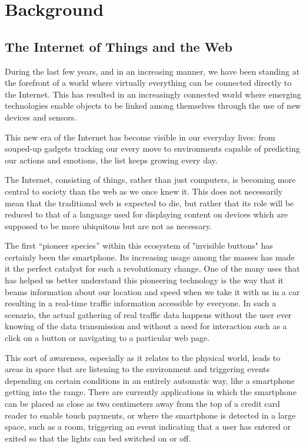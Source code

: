 \chead{}
\chapter{Background}

\section{The Internet of Things and the Web}
  
During the last few years, and in an increasing manner, we have been standing at the forefront of a world where virtually everything can be connected directly to the Internet. This has resulted in an increasingly connected world where emerging technologies enable objects to be linked among themselves through the use of new devices and sensors.

This new era of the Internet has become visible in our everyday lives: from souped-up gadgets tracking our every move to environments capable of predicting our actions and emotions, the list keeps growing every day.

The Internet, consisting of things, rather than just computers, is becoming more central to society than the web as we once knew it. This does not necessarily mean that the traditional web is expected to die, but rather that its role will be reduced to that of a language used for displaying content on devices which are supposed to be more ubiquitous but are not as necessary.

The first “pioneer species” within this ecosystem of "invisible buttons" has certainly been the smartphone. Its increasing usage among the masses has made it the perfect catalyst for such a revolutionary change. One of the many uses that has helped us better understand this pioneering technology is the way that it beams information about our location and speed when we take it with us in a car resulting in a real-time traffic information accessible by everyone. In such a scenario, the actual gathering of real traffic data happens without the user ever knowing of the data transmission and without a need for interaction such as a click on a button or navigating to a particular web page.

This sort of awareness, especially as it relates to the physical world, leads to areas in space that are listening to the environment and triggering events depending on certain conditions in an entirely automatic way, like a smartphone getting into the range. There are currently applications in which the smartphone can be placed as close as two centimeters away from the top of a credit card reader to enable touch payments, or where the smartphone is detected in a large space, such as a room, triggering an event indicating that a user has entered or exited so that the lights can bed switched on or off.

